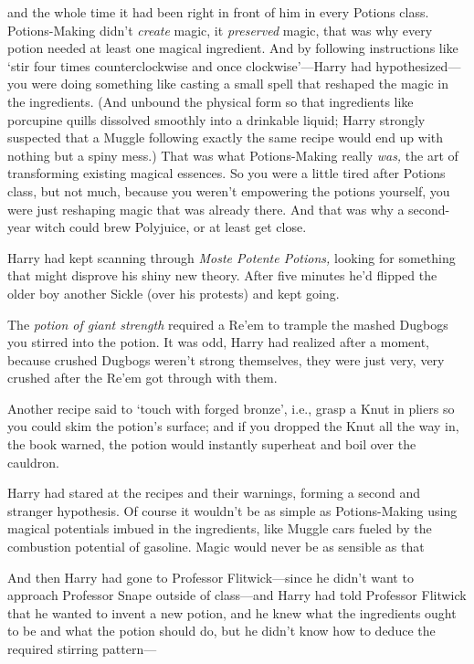 {\el} and the whole time it had been right in front of him in every Potions
class. Potions-Making didn't \emph{create} magic, it \emph{preserved} magic,
that was why every potion needed at least one magical ingredient. And by
following instructions like `stir four times counterclockwise and once
clockwise'—Harry had hypothesized—you were doing something like casting a
small spell that reshaped the magic in the ingredients. (And unbound the
physical form so that ingredients like porcupine quills dissolved smoothly into
a drinkable liquid; Harry strongly suspected that a Muggle following exactly
the same recipe would end up with nothing but a spiny mess.) That was what
Potions-Making really \emph{was,} the art of transforming existing magical
essences. So you were a little tired after Potions class, but not much, because
you weren't empowering the potions yourself, you were just reshaping magic that
was already there. And that was why a second-year witch could brew Polyjuice,
or at least get close.

Harry had kept scanning through \emph{Moste Potente Potions,} looking for
something that might disprove his shiny new theory. After five minutes he'd
flipped the older boy another Sickle (over his protests) and kept going.

The \emph{potion of giant strength} required a Re'em to trample the mashed
Dugbogs you stirred into the potion. It was odd, Harry had realized after a
moment, because crushed Dugbogs weren't strong themselves, they were
just{\el} very, very crushed after the Re'em got through with them.

Another recipe said to `touch with forged bronze', i.e., grasp a Knut in pliers
so you could skim the potion's surface; and if you dropped the Knut all the way
in, the book warned, the potion would instantly superheat and boil over the
cauldron.

Harry had stared at the recipes and their warnings, forming a second and
stranger hypothesis. Of course it wouldn't be as simple as Potions-Making using
magical potentials imbued in the ingredients, like Muggle cars fueled by the
combustion potential of gasoline. Magic would never be as sensible as
that{\el}

And then Harry had gone to Professor Flitwick—since he didn't want to
approach Professor Snape outside of class—and Harry had told Professor
Flitwick that he wanted to invent a new potion, and he knew what the
ingredients ought to be and what the potion should do, but he didn't know how
to deduce the required stirring pattern—

